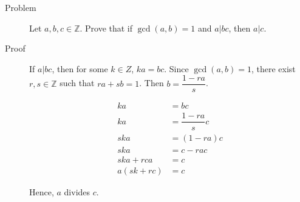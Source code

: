 \begin{description}
\item[Problem] Let $a, b, c \in \mathbb Z$. Prove that if $\gcd(a,b) = 1$ and
$a | bc$, then $a | c$.

\item[Proof] If $a | bc$, then for some $k \in Z$, $ka = bc$. Since $\gcd(a, b)
= 1$, there exist $r, s \in \mathbb Z$ such that $ra + sb = 1$. Then $b =
\dfrac{1 - r a}s$.

\begin{align*}
k a &= b c \\
k a &= \dfrac{1 - r a} s c \\
s k a &= (1 - r a) c \\
s k a &= c - r a c \\
s k a + r c a &= c \\
a (s k + r c) &= c
\end{align*}

Hence, $a$ divides $c$.

\end{description}
